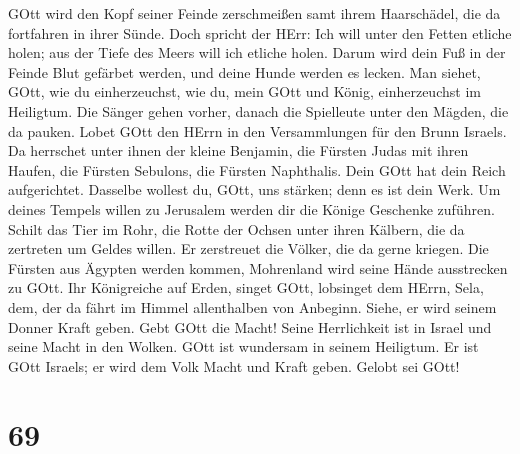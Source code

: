 GOtt wird den Kopf seiner Feinde zerschmeißen samt ihrem Haarschädel,
die da fortfahren in ihrer Sünde.  Doch spricht der HErr:
Ich will unter den Fetten etliche holen; aus der Tiefe des Meers will
ich etliche holen.  Darum wird dein Fuß in der Feinde Blut
gefärbet werden, und deine Hunde werden es lecken.  Man
siehet, GOtt, wie du einherzeuchst, wie du, mein GOtt und König,
einherzeuchst im Heiligtum.  Die Sänger gehen vorher,
danach die Spielleute unter den Mägden, die da pauken. 
Lobet GOtt den HErrn in den Versammlungen für den Brunn Israels.
 Da herrschet unter ihnen der kleine Benjamin, die Fürsten
Judas mit ihren Haufen, die Fürsten Sebulons, die Fürsten Naphthalis.
 Dein GOtt hat dein Reich aufgerichtet. Dasselbe wollest
du, GOtt, uns stärken; denn es ist dein Werk.  Um deines
Tempels willen zu Jerusalem werden dir die Könige Geschenke zuführen.
 Schilt das Tier im Rohr, die Rotte der Ochsen unter ihren
Kälbern, die da zertreten um Geldes willen. Er zerstreuet die Völker,
die da gerne kriegen.  Die Fürsten aus Ägypten werden
kommen, Mohrenland wird seine Hände ausstrecken zu GOtt. 
Ihr Königreiche auf Erden, singet GOtt, lobsinget dem HErrn, Sela,
 dem, der da fährt im Himmel allenthalben von Anbeginn.
Siehe, er wird seinem Donner Kraft geben.  Gebt GOtt die
Macht! Seine Herrlichkeit ist in Israel und seine Macht in den Wolken.
 GOtt ist wundersam in seinem Heiligtum. Er ist GOtt
Israels; er wird dem Volk Macht und Kraft geben. Gelobt sei GOtt!

\hypertarget{section-68}{%
\section{69}\label{section-68}}

